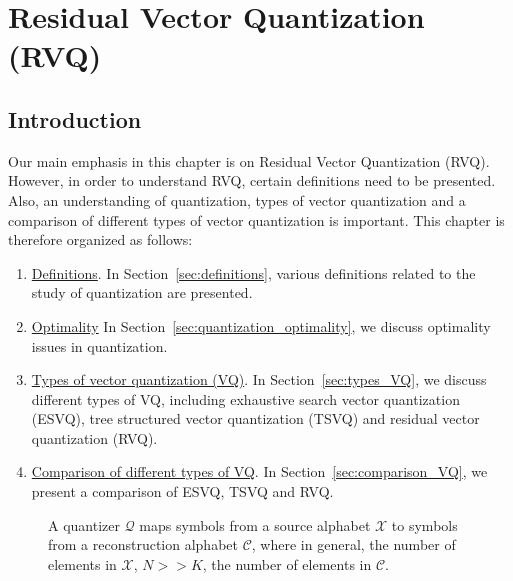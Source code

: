 %
%
%
\chapter{Residual Vector Quantization (RVQ)}
\label{chap_RVQ}	
\section{Introduction}
\label{sec:introduction}
Our main emphasis in this chapter is on Residual Vector Quantization (RVQ).  However, in order to understand RVQ, certain definitions need to be presented.  Also, an understanding of quantization, types of vector quantization and a comparison of different types of vector quantization is important.  This chapter is therefore organized as follows:

\begin{enumerate}
\item \underline{Definitions}.  In Section~\ref{sec:definitions}, various definitions related to the study of quantization are presented.
\item \underline{Optimality} In Section~\ref{sec:quantization_optimality}, we discuss optimality issues in quantization.
\item \underline{Types of vector quantization (VQ)}.  In Section~\ref{sec:types_VQ}, we discuss different types of VQ, including exhaustive search vector quantization (ESVQ),  tree structured vector quantization (TSVQ) and residual vector quantization (RVQ).
\item \underline{Comparison of different types of VQ}.  In Section~\ref{sec:comparison_VQ}, we present a comparison of ESVQ, TSVQ and RVQ.
\end{enumerate}

								\begin{figure}[t]	
								\centering		
								\caption{A quantizer $\mathcal{Q}$ maps symbols from a source alphabet $\mathcal{X}$ to symbols from a reconstruction alphabet $\mathcal{C}$, where in general, the number of elements in $\mathcal{X}$, $N >> K$, the number of elements in $\mathcal{C}$.}
								\label{fig:Quantization_block_diagram}
								\end{figure}


